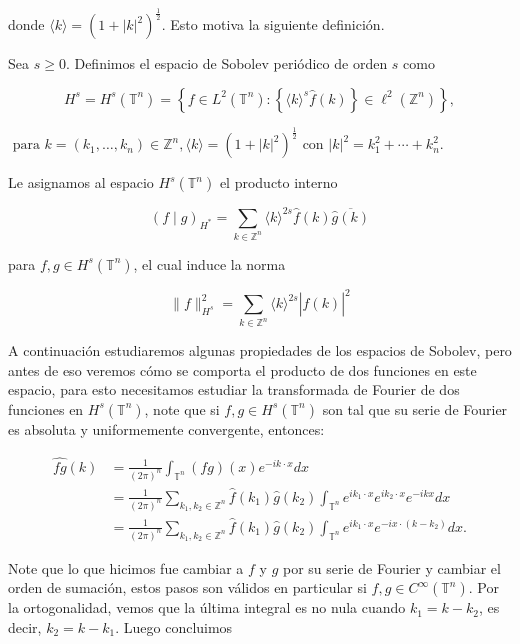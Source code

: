 \documentclass[12pt]{article}
\newcommand\Z{\ensuremath{\mathbb{Z}}}
\newcommand\T{\mathbb{T}}
\begin{document}
donde $\langle k\rangle=(1+|k|^2)^{\frac{1}{2}}$. Esto motiva la siguiente definición.


\begin{definition}
Sea $s \geq 0$. Definimos el espacio de Sobolev periódico de orden $s$ como

$$
H^s=H^s(\T^n)=\left\{f \in L^2(\T^n):\left\{\langle k\rangle^s \widehat{f}(k)\right\} \in \ell^2(\mathbb{Z}^n)\right\},
$$

$\text { para } k=\left(k_1, \ldots, k_n\right) \in \mathbb{Z}^n,\langle k\rangle=\left(1+|k|^2\right)^{\frac{1}{2}} \text { con }|k|^2=k_1^2+\cdots+k_n^2 \text {. }
$
\end{definition}

Le asignamos al espacio $H^s\left(\mathbb{T}^n\right)$ el producto interno

\begin{equation}
(f \mid g)_{H^*}=\sum_{k \in \mathbb{Z}^n}\langle k\rangle^{2 s} \widehat{f}(k) \overline{\widehat{g}(k)}
\end{equation}

para $f, g \in H^s\left(\mathbb{T}^n\right)$, el cual induce la norma

$$
\|f\|_{H^s}^2=\sum_{k \in \mathbb{Z}^n}\langle k\rangle^{2 s}|\widehat{f}(k)|^2
$$

A continuación estudiaremos algunas propiedades de los espacios de Sobolev, pero antes de eso veremos cómo se comporta el producto de dos funciones en este espacio, para esto necesitamos estudiar la transformada de Fourier de dos funciones en $H^s(\T^n)$, note que si $f,g\in H^s(\T^n)$ son tal que su serie de Fourier es absoluta y uniformemente convergente, entonces:

$$\begin{aligned}
\widehat{f g}(k) & =\frac{1}{(2 \pi)^n} \int_{\T^n}(f g)(x) e^{-i k\cdot x} d x \\
& =\frac{1}{(2 \pi)^n} \sum_{k_1,k_2\in \Z^n} \widehat{f}\left(k_1\right) \widehat{g}\left(k_2\right) \int_{\T^n} e^{i k_1\cdot x} e^{i k_2\cdot x} e^{-i k x} d x \\
& =\frac{1}{(2 \pi)^n} \sum_{k_1,k_2\in \Z^n} \widehat{f}\left(k_1\right) \widehat{g}\left(k_2\right) \int_{\T^n}e^{i k_1\cdot x} e^{-i x\cdot\left(k-k_2\right)} d x .
\end{aligned}$$

Note que lo que hicimos fue cambiar a $f $ y $g$ por su serie de Fourier y cambiar el orden de sumación, estos pasos son válidos en particular si $f,g\in C^{\infty}(\T^n)$. Por la ortogonalidad, vemos que la última integral es no nula cuando $k_1=k-k_2$, es decir, $k_2=k-k_1$. Luego concluimos
\end{document}
